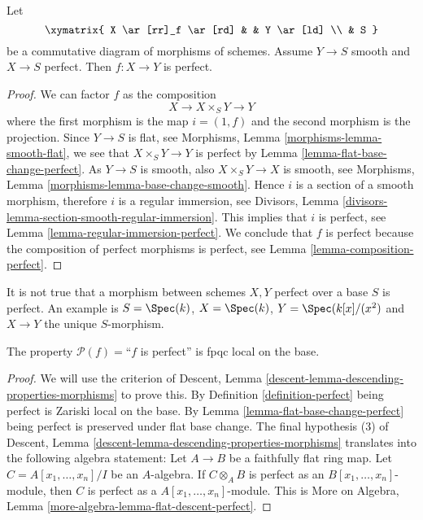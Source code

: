 \begin{lemma}
\label{lemma-perfect-permanence}
Let
$$
\xymatrix{
X \ar[rr]_f \ar[rd] & & Y \ar[ld] \\
& S
}
$$
be a commutative diagram of morphisms of schemes. Assume $Y \to S$
smooth and $X \to S$ perfect. Then $f : X \to Y$ is perfect.
\end{lemma}

\begin{proof}
We can factor $f$ as the composition
$$
X \longrightarrow X \times_S Y \longrightarrow Y
$$
where the first morphism is the map $i = (1, f)$ and the second
morphism is the projection. Since $Y \to S$ is flat, see
Morphisms, Lemma \ref{morphisms-lemma-smooth-flat},
we see that $X \times_S Y \to Y$ is perfect by
Lemma \ref{lemma-flat-base-change-perfect}.
As $Y \to S$ is smooth, also $X \times_S Y \to X$ is smooth, see
Morphisms, Lemma \ref{morphisms-lemma-base-change-smooth}.
Hence $i$ is a section of a smooth morphism, therefore $i$ is
a regular immersion, see
Divisors, Lemma \ref{divisors-lemma-section-smooth-regular-immersion}.
This implies that $i$ is perfect, see
Lemma \ref{lemma-regular-immersion-perfect}.
We conclude that $f$ is perfect because the composition of perfect
morphisms is perfect, see
Lemma \ref{lemma-composition-perfect}.
\end{proof}

\begin{remark}
\label{remark-perfect-permanence}
It is not true that a morphism between schemes $X, Y$ perfect over a base $S$
is perfect. An example is $S = \Spec(k)$, $X = \Spec(k)$,
$Y = \Spec(k[x]/(x^2)$ and $X \to Y$ the unique $S$-morphism.
\end{remark}

\begin{lemma}
\label{lemma-descending-property-perfect}
The property $\mathcal{P}(f) =$``$f$ is perfect''
is fpqc local on the base.
\end{lemma}

\begin{proof}
We will use the criterion of
Descent, Lemma \ref{descent-lemma-descending-properties-morphisms}
to prove this. By
Definition \ref{definition-perfect}
being perfect is Zariski local on the base. By
Lemma \ref{lemma-flat-base-change-perfect}
being perfect is preserved under flat base change.
The final hypothesis (3) of
Descent, Lemma \ref{descent-lemma-descending-properties-morphisms}
translates into the following algebra statement:
Let $A \to B$ be a faithfully flat ring map.
Let $C = A[x_1, \ldots, x_n]/I$ be an $A$-algebra.
If $C \otimes_A B$ is perfect as an $B[x_1, \ldots, x_n]$-module,
then $C$ is perfect as a $A[x_1, \ldots, x_n]$-module.
This is
More on Algebra, Lemma \ref{more-algebra-lemma-flat-descent-perfect}.
\end{proof}

